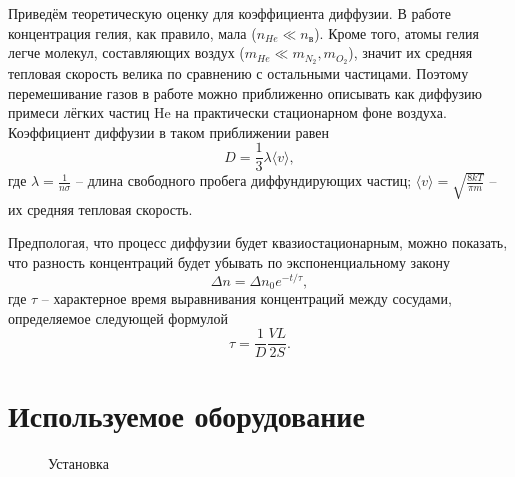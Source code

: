 \documentclass[a4paper,12pt]{article} %
\begin{document}
Приведём теоретическую оценку для коэффициента диффузии. В работе концентрация гелия, как правило, мала ($n_{He} \ll n_{в}$). Кроме того, атомы гелия легче молекул, составляющих воздух ($m_{He} \ll m_{N_2}, m_{O_2}$), значит их средняя тепловая скорость велика по сравнению с остальными частицами. Поэтому перемешивание газов в работе можно приближенно описывать как диффузию примеси лёгких частиц He на практически стационарном фоне воздуха. Коэффициент диффузии в таком приближении равен
\begin{equation}\label{D}
    D = \frac{1}{3} \lambda \langle v \rangle,
\end{equation}
где $\lambda = \frac{1}{n\sigma}$ -- длина свободного пробега диффундирующих частиц; $\langle v \rangle = \sqrt{\frac{8kT}{\pi m}}$ -- их средняя тепловая скорость.

Предпологая, что процесс диффузии будет квазиостационарным, можно показать, что разность концентраций будет убывать по экспоненциальному закону
\begin{equation}\label{Delta_n}
    \Delta n = \Delta n_0 e^{-t / \tau},
\end{equation}
где $\tau$ -- характерное время выравнивания концентраций между сосудами, определяемое следующей формулой
\begin{equation}\label{Tau}
    \tau = \frac{1}{D} \frac{VL}{2S}.
\end{equation}

\section{Используемое оборудование}

\begin{figure}[h]
    \caption{Установка}
    \label{установка}
\end{figure}
\end{document}
